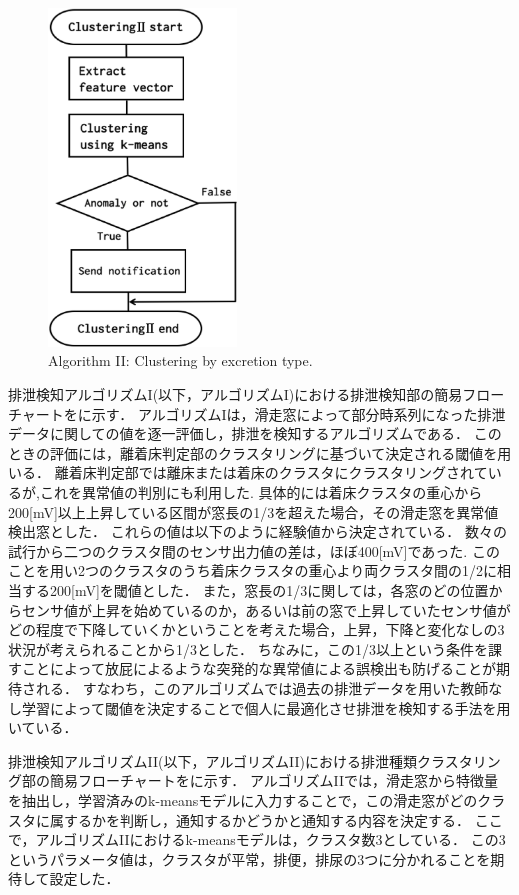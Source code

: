 \begin{figure}[t]
\centering
\includegraphics[width=5cm]{./fig/detection2.eps}
\caption{Algorithm I\hspace{-.1em}I: Clustering by excretion type.}
\label{cluster2}
\end{figure}

排泄検知アルゴリズムI(以下，アルゴリズムI)における排泄検知部の簡易フローチャートをに示す．
アルゴリズムIは，滑走窓によって部分時系列になった排泄データに関しての値を逐一評価し，排泄を検知するアルゴリズムである．
このときの評価には，離着床判定部のクラスタリングに基づいて決定される閾値を用いる．
離着床判定部では離床または着床のクラスタにクラスタリングされているが,これを異常値の判別にも利用した.
具体的には着床クラスタの重心から200[mV]以上上昇している区間が窓長の1/3を超えた場合，その滑走窓を異常値検出窓とした．
これらの値は以下のように経験値から決定されている．
数々の試行から二つのクラスタ間のセンサ出力値の差は，ほぼ400[mV]であった.
このことを用い2つのクラスタのうち着床クラスタの重心より両クラスタ間の1/2に相当する200[mV]を閾値とした．
また，窓長の1/3に関しては，各窓のどの位置からセンサ値が上昇を始めているのか，あるいは前の窓で上昇していたセンサ値がどの程度で下降していくかということを考えた場合，上昇，下降と変化なしの3状況が考えられることから1/3とした．
ちなみに，この1/3以上という条件を課すことによって放屁によるような突発的な異常値による誤検出も防げることが期待される．
すなわち，このアルゴリズムでは過去の排泄データを用いた教師なし学習によって閾値を決定することで個人に最適化させ排泄を検知する手法を用いている．

排泄検知アルゴリズムI\hspace{-.1em}I(以下，アルゴリズムI\hspace{-.1em}I)における排泄種類クラスタリング部の簡易フローチャートをに示す．
アルゴリズムI\hspace{-.1em}Iでは，滑走窓から特徴量を抽出し，学習済みのk-meansモデルに入力することで，この滑走窓がどのクラスタに属するかを判断し，通知するかどうかと通知する内容を決定する．
ここで，アルゴリズムI\hspace{-.1em}Iにおけるk-meansモデルは，クラスタ数3としている．
この3というパラメータ値は，クラスタが{平常，排便，排尿}の3つに分かれることを期待して設定した．

